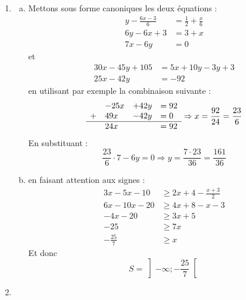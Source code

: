 \documentclass[12pt, addpoints]{exam}
\begin{document}
\begin{questions}
\begin{solution}
\begin{enumerate}[1.]
\begin{enumerate}[(a)]
$$                $$
                Et donc
                $$
                =-2^8\cdot 3^{-7} \cdot x^{11} = -\frac{2^8 x^{11}}{3^7}
                $$
            \end{enumerate}
    \item 
            \begin{enumerate}[(a)]
                \item Mettons sous forme canoniques les deux équations :
                \begin{align*}
                    y-\frac{6x-3}{6} &=\frac{1}{2}+\frac{x}{6}\\
                    6y-6x+3 &=3+x\\
                    7x-6y&=0
                \end{align*}
                et
                \begin{align*}
                    30x-45y+105 &= 5x+10y-3y+3\\
                    25x-42y&=-92
                \end{align*}
                en utilisant par exemple la combinaison suivante :
                $$
                \begin{array}{llll}
                     &-25x &+42y &=92  \\
                    + & 49x & -42y &=0\\
                    \hline
                    &24x & &=92
                \end{array}
                \Rightarrow x=\frac{92}{24} = \frac{23}{6}
                $$
                En substituant :
                $$
                \frac{23}{6}\cdot 7 -6y=0 \Rightarrow y = \frac{7\cdot 23}{36}=\frac{161}{36}
                $$
                \item en faisant attention aux signes :
                \begin{align*}
                    3x-5x-10 &\geq 2x+4-\frac{x+3}{2}\\
                    6x-10x-20 &\geq 4x+8-x-3\\
                    -4x-20 &\geq 3x+5\\
                    -25 &\geq 7x\\
                    -\frac{25}{7} & \geq x
                \end{align*}
                Et donc 
                $$
                S=\left] -\infty ; -\frac{25}{7}\right[
                $$
            \end{enumerate}
    \item

\end{enumerate}
\end{solution}
\end{questions}
\end{document}
